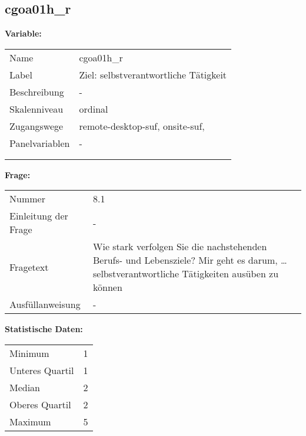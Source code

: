	
	
	\subsection{cgoa01h\_r}
	\label{subSection:cgoa01h_r}

	\noindent\textbf{Variable:}\\
		\begin{tabular}{lL{11.3cm}}
			\label{tableVariable:cgoa01h_r}
			Name & cgoa01h\_r \\
			Label & Ziel: selbstverantwortliche Tätigkeit \\
			Beschreibung & - \\
			Skalenniveau & ordinal \\
			Zugangswege &
				remote-desktop-suf,
				onsite-suf,
 \\
			Panelvariablen & -
			 \\
			 \\
 \\
		\end{tabular}

		\vspace*{1 cm}
		\noindent\textbf{Frage:}\\
		\begin{tabular}{lL{11.3cm}}
			\label{tableQuestion:cgoa01h_r}
			Nummer & 8.1 \\
			Einleitung der Frage & - \\
			Fragetext & Wie stark verfolgen Sie die nachstehenden Berufs- und Lebensziele?
Mir geht es darum, …
selbstverantwortliche Tätigkeiten ausüben zu können \\
			Ausfüllanweisung & - \\
		\end{tabular}


		\vspace*{1 cm}
		\noindent\textbf{Statistische Daten:}\\
			\begin{tabular}{ll}
				\label{tableStatistics:cgoa01h_r}
					Minimum & 1 \\
					Unteres Quartil & 1 \\
					Median & 2 \\
					Oberes Quartil & 2 \\
					Maximum & 5 \\
			\end{tabular}



